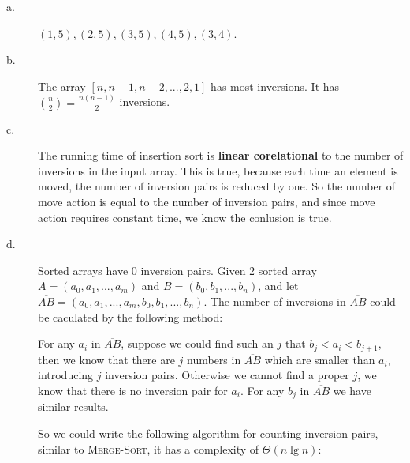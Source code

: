 \documentclass{article}
\begin{document}
\begin{description}
\item[a. \hspace{9pt}] $(1, 5), (2, 5), (3, 5), (4, 5), (3, 4)$.

\item[b. \hspace{9pt}] The array $[n, n -1, n - 2, ..., 2, 1]$ has most inversions. It has ${{n}\choose{2}} = \frac{n(n - 1)}{2}$ inversions.

\item[c. \hspace{9pt}] The running time of insertion sort is \textbf{linear corelational} to the number of inversions in the input array.
This is true, because each time an element is moved, the number of inversion pairs is reduced by one. So the number of move action is equal to
the number of inversion pairs, and since move action requires constant time, we know the conlusion is true.

\item[d. \hspace{9pt}] Sorted arrays have 0 inversion pairs. Given 2 sorted array $A=(a_0, a_1, ..., a_m)$ and $B = (b_0, b_1, ..., b_n)$,
and let $\overline{AB} = (a_0, a_1, ..., a_m, b_0, b_1, ..., b_n)$. The number of inversions in $\overline{AB}$ could be caculated by the following method:

For any $a_i$ in $\overline{AB}$, suppose we could find such an $j$ that $b_j < a_i < b_{j + 1}$, then we know that there are $j$ numbers in $\overline{AB}$
which are smaller than $a_i$, introducing $j$ inversion pairs. Otherwise we cannot find a proper $j$, we know that there is no inversion pair for $a_i$.
For any $b_j$ in $\overline{AB}$ we have similar results.

So we could write the following algorithm for counting inversion pairs, similar to \textsc{Merge-Sort}, it has a complexity of $\Theta(n\lg n)$:


\end{description}
\end{document}
